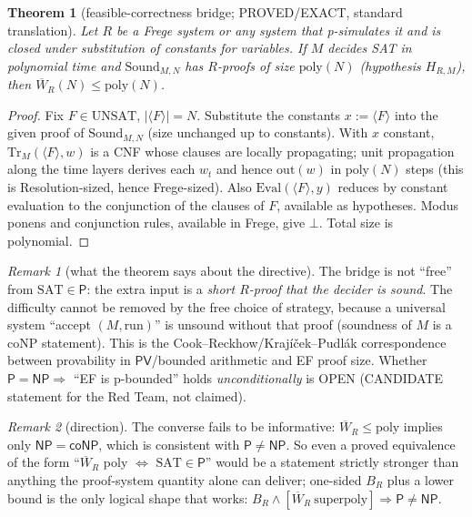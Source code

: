 \documentclass[11pt]{article}
\newtheorem{theorem}{Theorem}
\theoremstyle{remark}
\newtheorem{remark}{Remark}
\newcommand{\Wbar}{\overline W}
\newcommand{\UNSAT}{\mathrm{UNSAT}}
\begin{document}
\begin{theorem}[feasible-correctness bridge; PROVED/EXACT, standard translation]\label{t:bridge}
Let $R$ be a Frege system or any system that p-simulates it and is closed under substitution of
constants for variables. If $M$ decides SAT in polynomial time and $\mathrm{Sound}_{M,N}$ has $R$-proofs of size
$\mathrm{poly}(N)$ (hypothesis $H_{R,M}$), then $\Wbar_R(N)\le\mathrm{poly}(N)$.
\end{theorem}
\begin{proof} Fix $F\in\UNSAT$, $|\langle F\rangle|=N$. Substitute the constants $x:=\langle F\rangle$ into the
given proof of $\mathrm{Sound}_{M,N}$ (size unchanged up to constants). With $x$ constant,
$\mathrm{Tr}_M(\langle F\rangle,w)$ is a CNF whose clauses are locally propagating; unit propagation
along the time layers derives each $w_t$ and hence $\mathrm{out}(w)$ in $\mathrm{poly}(N)$ steps (this is Resolution-sized,
hence Frege-sized). Also $\mathrm{Eval}(\langle F\rangle,y)$ reduces by constant evaluation to the conjunction of the
clauses of $F$, available as hypotheses. Modus ponens and conjunction rules, available in Frege, give $\bot$. Total size is polynomial.
\end{proof}

\begin{remark}[what the theorem says about the directive]
The bridge is not ``free'' from $\mathrm{SAT}\in\mathsf P$: the extra input is a \emph{short $R$-proof
that the decider is sound}. The difficulty cannot be removed by the free choice of strategy,
because a universal system ``accept $(M,\text{run})$'' is unsound without that proof
(soundness of $M$ is a coNP statement). This is the Cook--Reckhow/Krajíček--Pudlák
correspondence between provability in $\mathsf{PV}$/bounded arithmetic and EF proof size. Whether
$\mathsf P=\mathsf{NP}\Rightarrow$ ``EF is p-bounded'' holds \emph{unconditionally} is OPEN (CANDIDATE
statement for the Red Team, not claimed).
\end{remark}

\begin{remark}[direction]
The converse fails to be informative: $\Wbar_R\le\mathrm{poly}$ implies only $\mathsf{NP}=\mathsf{coNP}$,
which is consistent with $\mathsf P\ne\mathsf{NP}$. So even a proved equivalence of the form
``$\Wbar_R$ poly $\iff$ $\mathrm{SAT}\in\mathsf P$'' would be a statement strictly stronger than anything the
proof-system quantity alone can deliver; one-sided $B_R$ plus a lower bound is the only logical
shape that works: $B_R\wedge[\Wbar_R\ \text{superpoly}]\Rightarrow\mathsf P\ne\mathsf{NP}$.
\end{remark}
\end{document}
